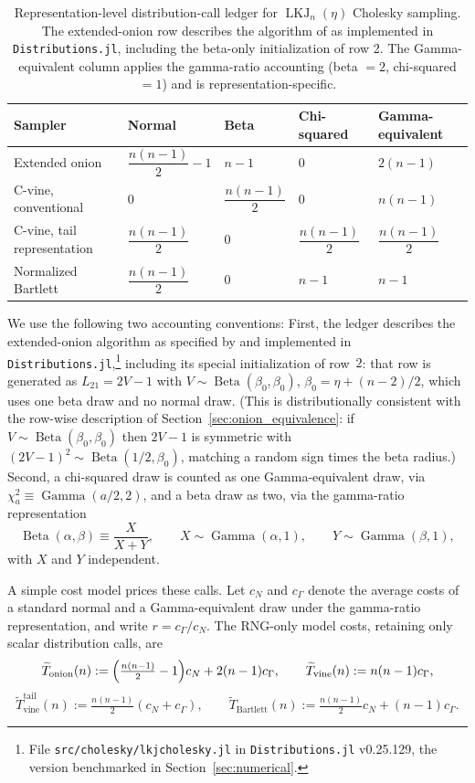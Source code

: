 \documentclass[12pt,english]{article}
\theoremstyle{plain} %
\theoremstyle{definition} %
\theoremstyle{remark} %
\begin{document}
\begin{table}[H]
\centering
\caption{Representation-level distribution-call ledger for $\operatorname{LKJ}_n(\eta)$ Cholesky sampling. The extended-onion row describes the algorithm of \citet{LewandowskiKurowickaJoe:2009} as implemented in \texttt{Distributions.jl}, including the beta-only initialization of row 2. The Gamma-equivalent column applies the gamma-ratio accounting (beta $=2$, chi-squared $=1$) and is representation-specific.}
\label{tab:rng_ledger}
\begin{tabularx}{\textwidth}{lYYYY}
\toprule
Sampler & Normal & Beta & Chi-squared & Gamma-equivalent \\
\midrule
Extended onion & $\dfrac{n(n-1)}{2}-1$ & $n-1$ & $0$ & $2(n-1)$ \\[6pt]
C-vine, conventional & $0$ & $\dfrac{n(n-1)}{2}$ & $0$ & $n(n-1)$ \\[6pt]
C-vine, tail representation & $\dfrac{n(n-1)}{2}$ & $0$ & $\dfrac{n(n-1)}{2}$ & $\dfrac{n(n-1)}{2}$ \\[6pt]
Normalized Bartlett & $\dfrac{n(n-1)}{2}$ & $0$ & $n-1$ & $n-1$ \\
\bottomrule
\end{tabularx}
\end{table}

We use the following two accounting conventions: First, the ledger describes the extended-onion algorithm as specified by \citet[Section~3.2]{LewandowskiKurowickaJoe:2009} and implemented in \texttt{Distributions.jl},\footnote{File \texttt{src/cholesky/lkjcholesky.jl} in \texttt{Distributions.jl} v0.25.129, the version benchmarked in Section~\ref{sec:numerical}.} including its special initialization of row~$2$: that row is generated as $L_{21}=2V-1$ with $V\sim\operatorname{Beta}(\beta_0,\beta_0)$, $\beta_0=\eta+(n-2)/2$, which uses one beta draw and no normal draw. (This is distributionally consistent with the row-wise description of Section~\ref{sec:onion_equivalence}: if $V\sim\operatorname{Beta}(\beta_0,\beta_0)$ then $2V-1$ is symmetric with $(2V-1)^2\sim\operatorname{Beta}(1/2,\beta_0)$, matching a random sign times the beta radius.) Second, a chi-squared draw is counted as one Gamma-equivalent draw, via $\chi^2_a\equiv\operatorname{Gamma}(a/2,2)$, and a beta draw as two, via the gamma-ratio representation
$$
\operatorname{Beta}(\alpha,\beta)
\equiv
\frac{X}{X+Y},
\qquad
X\sim\operatorname{Gamma}(\alpha,1),
\qquad
Y\sim\operatorname{Gamma}(\beta,1),
$$
with $X$ and $Y$ independent.

A simple cost model prices these calls. Let $c_N$ and $c_\Gamma$ denote the average costs of a standard normal and a Gamma-equivalent draw under the gamma-ratio representation, and write $r=c_\Gamma/c_N$. The RNG-only model costs, retaining only scalar distribution calls, are
$$
\widetilde{T}_{\operatorname{onion}}(n):=\Bigl(\tfrac{n(n-1)}{2}-1\Bigr)c_N+2(n-1)c_\Gamma,
\qquad
\widetilde{T}_{\operatorname{vine}}(n):=n(n-1)c_\Gamma,
$$
$$
\widetilde{T}_{\operatorname{vine}}^{\operatorname{tail}}(n):=\tfrac{n(n-1)}{2}(c_N+c_\Gamma),
\qquad
\widetilde{T}_{\operatorname{Bartlett}}(n):=\tfrac{n(n-1)}{2}c_N+(n-1)c_\Gamma .
$$
\end{document}
